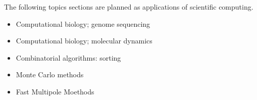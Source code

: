 The following topics sections are planned as applications of scientific
computing.

\begin{itemize}
\item Computational biology; genome sequencing
\item Computational biology; molecular dynamics
\item Combinatorial algorithms: sorting
\item Monte Carlo methods
\item Fast Multipole Moethods
\end{itemize}
